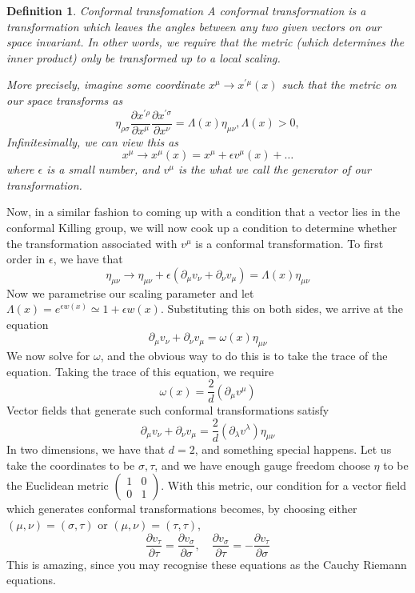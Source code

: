 \documentclass[11pt, oneside]{article}   	%
\theoremstyle{slanted}
\newtheorem*{defn}{Definition}
\begin{document}
\begin{defn}{Conformal transfomation}
A conformal transformation 
is a transformation which leaves the 
angles between any two given 
vectors on our space invariant. 
In other words, we require 
that the metric (which determines the inner product)
only be transformed up to a local scaling. 


More precisely, imagine some coordinate $ x ^ \mu \to x ^{ ' \mu } \left( x  \right)  $ 
such that the metric on our space 
transforms as 
\[
\eta _{ \rho \sigma  } \frac{\partial x ^{ ' \rho } }{\partial  x ^ \mu }  
\frac{\partial x ^{  ' \sigma } }{\partial  x ^ \nu }  =  \Lambda \left( x  \right) 
\eta _{ \mu \nu }, \Lambda \left( x  \right)  > 0,  
\] Infinitesimally, 
we can view this as \[
x ^ \mu \to x ^ \mu \left( x  \right)   = x ^ \mu 
+ \epsilon v ^ \mu \left( x  \right)  + \dots 
\] where $ \epsilon $ is a small number, and $ v ^ \mu $ is 
the what we call the generator of our transformation.
\end{defn}
Now, in a similar fashion to 
coming up with a condition that a vector lies in 
the conformal Killing group, we will now 
cook up a condition to determine 
whether the transformation associated with $ v^ \mu $  
is a conformal transformation. 
To first order in $ \epsilon $, we have that 
\[
\eta _{ \mu \nu } \to \eta _{ \mu \nu } + \epsilon \left( 
\partial  _ \mu v _ \nu + \partial  _ \nu v _ \mu \right)  
 = \Lambda \left(  x  \right) \eta _{ \mu \nu }
\] Now we parametrise 
our scaling parameter and let $ \Lambda \left(  x  \right)   = e ^{ \epsilon w \left( x  \right)  } 
 \simeq 1 + \epsilon w \left( x  \right)  $. 
 Substituting this on both sides, 
 we arrive at the equation 
 \[
	 \partial  _ \mu v _ \nu + \partial  _ \nu v _ \mu  = \omega \left( x  \right)  
	 \eta _{ \mu \nu }
 \] We now solve for $ \omega $, and the 
 obvious way to do this is to take the trace 
 of the equation. Taking the trace of this equation, we 
 require 
 \[
	 \omega \left( x  \right)  = \frac{2}{d } \left( \partial  _ \mu v ^ \mu  \right) 
 \] Vector fields that generate 
 such conformal transformations 
 satisfy 
 \[
  \partial  _ \mu v _ \nu + \partial  _ \nu v _ \mu 
  = \frac{2}{d } \left( \partial  _ \lambda v ^ \lambda   \right)  \eta _{ \mu \nu } 
 \] In two dimensions, 
 we have that $ d = 2 $, 
and something special happens. 
Let us take the coordinates to be $ \sigma, \tau $, and 
we have enough gauge freedom 
choose $ \eta $ to be the Euclidean 
metric $ \begin{pmatrix}  1 & 0 \\ 0 & 1  \end{pmatrix} $. 
With this metric, our condition for a vector field 
which generates conformal transformations becomes, 
by choosing either $ \left( \mu , \nu  \right)  = 
\left( \sigma, \tau  \right)   $  or $ \left( \mu , \nu  \right)  
 = \left( \tau , \tau  \right)  $, 
\[
 \frac{\partial  v_ \tau  }{\partial  \tau }   = \frac{\partial  v _ \sigma }{\partial  \sigma } , 
 \quad \frac{\partial  v _\sigma }{\partial  \tau }  =  - \frac{\partial  
 v _ \tau }{\partial  \sigma }  
\] This is amazing, since you 
may recognise these equations as the Cauchy Riemann equations.
\end{document}

